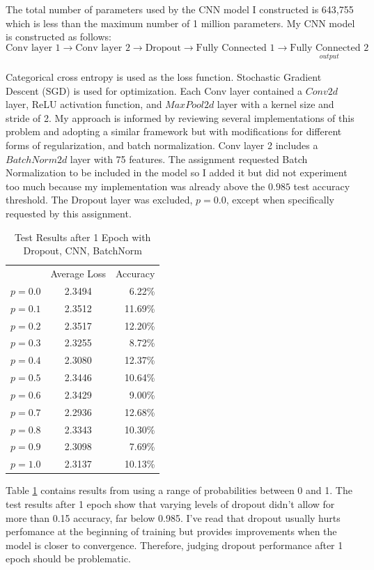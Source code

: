 \documentclass[a4paper,12pt]{article} %
\begin{document}
The total number of parameters used by the CNN model I constructed is
643,755 which is less than the maximum number of 1 million parameters. My
CNN model is constructed as follows:
\[
\boxed{\text{Conv layer 1}} \rightarrow
\boxed{\text{Conv layer 2}} \rightarrow
\boxed{\text{Dropout}} \rightarrow
\boxed{\text{Fully Connected 1}}\rightarrow
\underset{output}{\boxed{\text{Fully Connected 2}}}
\]

Categorical cross entropy is used as the loss function. Stochastic
Gradient Descent (SGD) is used for optimization. Each Conv layer
contained a $Conv2d$ layer, ReLU activation function, and
$MaxPool2d$ layer with a kernel size and stride of 2. My approach is
informed by reviewing several implementations of this problem and adopting
a similar framework but with modifications for different forms of
regularization, and batch normalization. Conv layer 2 includes a
$BatchNorm2d$ layer with 75 features. The assignment requested Batch
Normalization to be included in the model so I added it but did not
experiment too much because my implementation was already above the
$0.985$ test accuracy threshold. The Dropout layer was excluded, $p=0.0$,
except when specifically requested by this assignment. \linebreak

\begin{table}[ht]
\centering
\caption{Test Results after 1 Epoch with Dropout, CNN, BatchNorm}
\label{table:dropout}
\begin{tabular}[t]{lcr}
\toprule
&Average Loss & Accuracy\\
$p=0.0$ & 2.3494 & 6.22\% \\
$p=0.1$ & 2.3512 & 11.69\%\\
$p=0.2$ & 2.3517 & 12.20\%\\
$p=0.3$ & 2.3255 & 8.72\% \\
$p=0.4$ & 2.3080 & 12.37\%\\
$p=0.5$ & 2.3446 & 10.64\%\\
$p=0.6$ & 2.3429 & 9.00\%\\
$p=0.7$ & 2.2936 & 12.68\%\\
$p=0.8$ & 2.3343 & 10.30\%\\
$p=0.9$ & 2.3098 & 7.69\%\\
$p=1.0$ & 2.3137 & 10.13\%\\
\midrule
\bottomrule
\end{tabular}
\end{table}


Table \ref{table:dropout} contains results from using a range of probabilities
between 0 and 1. The test results after 1 epoch show that varying levels
of dropout didn't allow for more than 0.15 accuracy, far below 0.985. I've
read that dropout usually hurts perfomance at the beginning of training but
provides improvements when the model is closer to convergence. Therefore,
judging dropout performance after 1 epoch should be problematic.\newline
\end{document}
